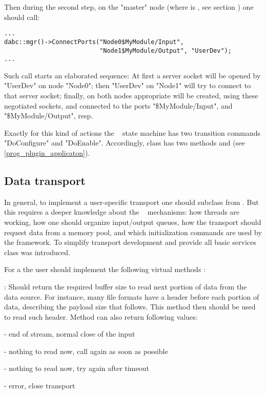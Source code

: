 Then during the second step, on the "master" node 
(where  is , 
see section \label{prog_manager_controls_manager})
one should call:
\begin{small}
\begin{verbatim}
...
dabc::mgr()->ConnectPorts("Node0$MyModule/Input", 
                          "Node1$MyModule/Output", "UserDev");
...
\end{verbatim}     
\end{small}
 
Such call starts an elaborated sequence: At first a server socket will be opened 
by  "UserDev" on node "Node0";
then  "UserDev" on "Node1" will try to connect to that server socket;
finally, on both nodes appropriate  
will be created, using these negotiated sockets,
and connected to the ports "\$MyModule/Input", and  "\$MyModule/Output", resp.

Exactly for this kind of actions the \dabc~ state machine has 
two transition commands "DoConfigure" and "DoEnable". Accordingly, class
 has two methods  and 
 (see \ref{prog_plugin_applicaton}).  


\subsection{Data transport}
\label{prog_plugin_device_datatransport}
In general, to implement a user-specific transport one should subclass from
. But this requires a deeper knowledge 
about the \dabc~ mechanisms:
how threads are working,
how one should organize input/output queues, how the transport should request data from a
memory pool, and which initialization commands are used by the framework. 
To simplify transport development and provide all basic services 
class  was introduced.  

For a  the
user should implement the  following virtual methods : 

\bbul
\item [\func{Read\_Size()}] : 
   Should return the required buffer size to read next portion of data from
   the data source. For instance, many file formats have a header before
   each portion of data, describing the payload size that follows. 
   This method then should be used to read such header. 
   Method can also return following values:
   \bdes
   \item[\keyw{dabc::di\_EndOfStream}] - end of stream, normal close of the input
   \item[\keyw{dabc::di\_Repeat}]      - nothing to read now, call again as soon as possible
   \item[\keyw{dabc::di\_RepeatTimeout}] - nothing to read now, try again after timeout
   \item[\keyw{dabc::di\_Error}]         - error, close transport
   \edes

